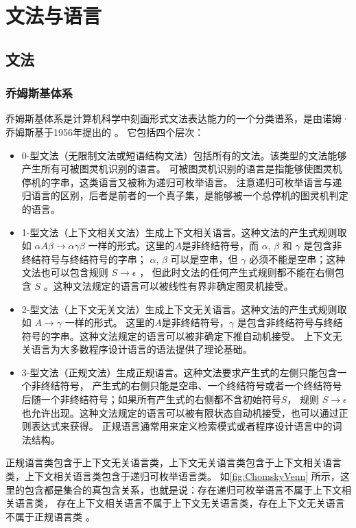 \chapter{文法与语言}
\section{文法}
\subsection{乔姆斯基体系}
乔姆斯基体系是计算机科学中刻画形式文法表达能力的一个分类谱系，是由诺姆·乔姆斯基于1956年提出的
\cite{DBLP:journals/tit/Chomsky56}。
它包括四个层次：
\begin{itemize}
  \item 0-型文法（无限制文法或短语结构文法）包括所有的文法。该类型的文法能够产生所有可被图灵机识别的语言。
    可被图灵机识别的语言是指能够使图灵机停机的字串，这类语言又被称为递归可枚举语言。
    注意递归可枚举语言与递归语言的区别，后者是前者的一个真子集，是能够被一个总停机的图灵机判定的语言。

  \item 1-型文法（上下文相关文法）生成上下文相关语言。这种文法的产生式规则取如 $ \alpha A \beta \rightarrow \alpha \gamma \beta $
    一样的形式。这里的$A$是非终结符号，而 $\alpha$, $\beta$ 和 $\gamma$ 是包含非终结符号与终结符号的字串；
    $\alpha$, $\beta$ 可以是空串，但 $\gamma$ 必须不能是空串；这种文法也可以包含规则 $S \rightarrow \epsilon$ ，
    但此时文法的任何产生式规则都不能在右侧包含 $S$ 。这种文法规定的语言可以被线性有界非确定图灵机接受。

  \item 2-型文法（上下文无关文法）生成上下文无关语言。这种文法的产生式规则取如 $A \rightarrow \gamma$ 一样的形式。
    这里的$A$是非终结符号，$\gamma$ 是包含非终结符号与终结符号的字串。这种文法规定的语言可以被非确定下推自动机接受。
    上下文无关语言为大多数程序设计语言的语法提供了理论基础。

  \item 3-型文法（正规文法）生成正规语言。这种文法要求产生式的左侧只能包含一个非终结符号，
    产生式的右侧只能是空串、一个终结符号或者一个终结符号后随一个非终结符号；如果所有产生式的右侧都不含初始符号$S$，
    规则 $ S \rightarrow \epsilon$ 也允许出现。这种文法规定的语言可以被有限状态自动机接受，也可以通过正则表达式来获得。
    正规语言通常用来定义检索模式或者程序设计语言中的词法结构。
\end{itemize}

正规语言类包含于上下文无关语言类，上下文无关语言类包含于上下文相关语言类，上下文相关语言类包含于递归可枚举语言类。
如\cref{fig:ChomskyVenn} 所示，这里的包含都是集合的真包含关系，也就是说：存在递归可枚举语言不属于上下文相关语言类，
存在上下文相关语言不属于上下文无关语言类，存在上下文无关语言不属于正规语言类
\cite{DBLP:journals/iandc/Chomsky59a}。

